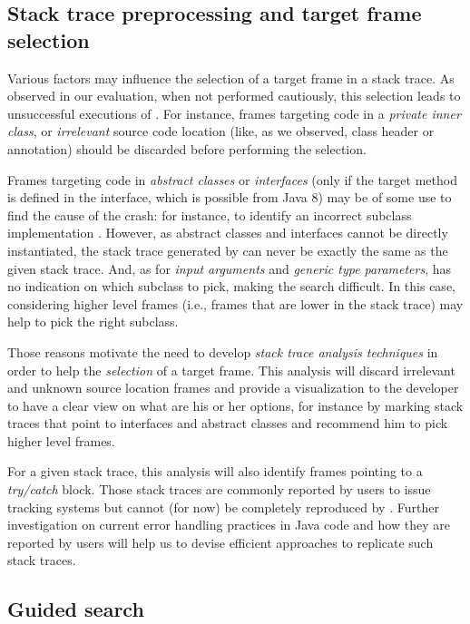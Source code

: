 \subsection{Stack trace preprocessing and target frame selection}

Various factors may influence the selection of a target frame in a stack trace.
As observed in our evaluation, when not performed cautiously, this selection leads to unsuccessful executions of \evocrash.
For instance, frames targeting code in a \emph{private inner class}, or \emph{irrelevant} source code location (like, as we observed, class header or annotation) should be discarded before performing the selection.

Frames targeting code in \emph{abstract classes} or \emph{interfaces} (only if the target method is defined in the interface, which is possible from Java 8) may be of some use to find the cause of the crash:  for instance, to identify an incorrect subclass implementation \cite{Liskov2000}.
However, as abstract classes and interfaces cannot be directly instantiated, the stack trace generated by \evocrash can never be exactly the same as the given stack trace.
And, as for \emph{input arguments} and \emph{generic type parameters}, \evocrash has no indication on which subclass to pick, making the search difficult.
In this case, considering higher level frames (i.e., frames that are lower in the stack trace) may help to pick the right subclass.

Those reasons motivate the need to develop \emph{stack trace analysis techniques} in order to help the \emph{selection} of a target frame.
This analysis will discard irrelevant and unknown source location frames and provide a visualization to the developer to have a clear view on what are his or her options, for instance by marking stack traces that point to interfaces and abstract classes and recommend him to pick higher level frames.

For a given stack trace, this analysis will also identify frames pointing to a \emph{try/catch} block.
Those stack traces are commonly reported by users to issue tracking systems but cannot (for now) be completely reproduced by \evocrash.
Further investigation on current error handling practices in Java code \cite{Cabral2007,Coelho2017} and how they are reported by users \cite{Maiga2015} will help us to devise efficient approaches to replicate such stack traces.

\subsection{Guided search}

